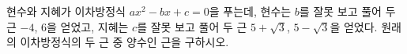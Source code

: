 현수와 지혜가 이차방정식 $ax^2-bx+c=0$을 푸는데, 현수는 $b$를 잘못 보고 풀어 두 근 $-4$, $6$을 얻었고, 지혜는 $c$를 잘못 보고 풀어 두 근 $5+\sqrt{3}$, $5-\sqrt{3}$을 얻었다. 원래의 이차방정식의 두 근 중 양수인 근을 구하시오. 
